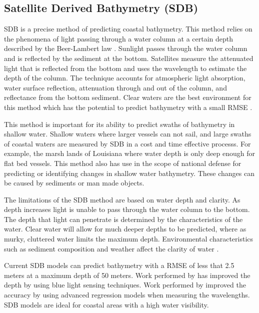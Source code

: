 \subsection{Satellite Derived Bathymetry (SDB)}
\ac{SDB} is a precise method of predicting coastal bathymetry. 
This method relies on the phenomena of light passing through a water column at a certain depth described by the Beer-Lambert law \cite{chybicki2018three}\cite{vinayaraj2016satellite}.
Sunlight passes through the water column and is reflected by the sediment at the bottom.
Satellites measure the attenuated light that is reflected from the bottom and uses the wavelength to estimate the depth of the column.
The technique accounts for atmospheric light absorption, water surface reflection, attenuation through and out of the column, and reflectance from the bottom sediment.
Clear waters are the best environment for this method which has the potential to predict bathymetry with a small RMSE \cite{chybicki2018three}.

\par
This method is important for its ability to predict swaths of bathymetry in shallow water.
Shallow waters where larger vessels can not sail, and large swaths of coastal waters are measured by \ac{SDB} in a cost and time effective processs.
For example, the marsh lands of Louisiana where water depth is only deep enough for flat bed vessels.
This method also has use in the scope of national defense for predicting or identifying changes in shallow water bathymetry.
These changes can be caused by sediments or man made objects. 

\par
The limitations of the \ac{SDB} method are based on water depth and clarity.
As depth increases light is unable to pass through the water column to the bottom.
The depth that light can penetrate is determined by the characteristics of the water.
Clear water will allow for much deeper depths to be predicted, where as murky, cluttered water limits the maximum depth.
Environmental characteristics such as sediment composition and weather affect the clarity of water \cite{vinayaraj2016satellite}.

\par
Current \ac{SDB} models can predict bathymetry with a \ac{RMSE} of less that 2.5 meters at a maximum depth of 50 meters.
Work performed by \cite{vinayaraj2016satellite} has improved the depth by using blue light sensing techniques.
Work performed by \cite{chybicki2018three} improved the accuracy by using advanced regression models when measuring the wavelengths.
\ac{SDB} models are ideal for coastal areas with a high water visibility.

